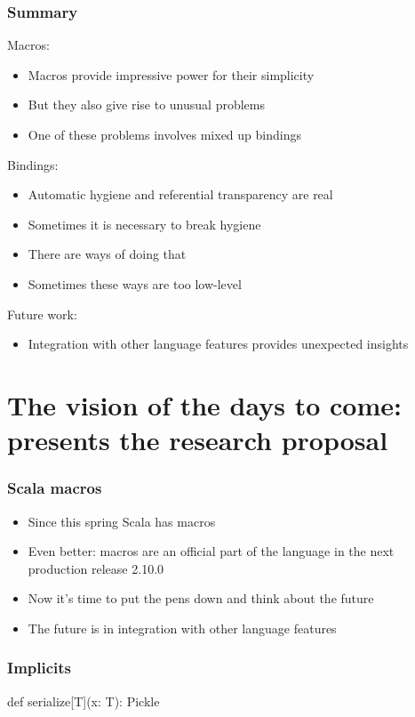 \documentclass[hyperref={bookmarks=false}]{beamer}
\begin{document}
\begin{frame}[fragile]
\frametitle{Summary}
Macros:
\begin{itemize}
\item Macros provide impressive power for their simplicity
\item But they also give rise to unusual problems
\item One of these problems involves mixed up bindings
\end{itemize}

\pause
Bindings:
\begin{itemize}
\item Automatic hygiene and referential transparency are real
\item Sometimes it is necessary to break hygiene
\item There are ways of doing that
\item Sometimes these ways are too low-level
\end{itemize}

\pause
Future work:
\begin{itemize}
\item Integration with other language features provides unexpected insights
\end{itemize}
\end{frame}

\section{The vision of the days to come: presents the research proposal}

\begin{frame}[fragile]
\frametitle{Scala macros}
\begin{itemize}
\item Since this spring Scala has macros
\item Even better: macros are an official part of the language in the next production release 2.10.0
\item Now it's time to put the pens down and think about the future
\item The future is in integration with other language features
\end{itemize}
\end{frame}

\begin{frame}[fragile]
\frametitle{Implicits}
\begin{semiverbatim}
def serialize[T](x: T): Pickle

\end{semiverbatim}
\end{frame}
\end{document}
